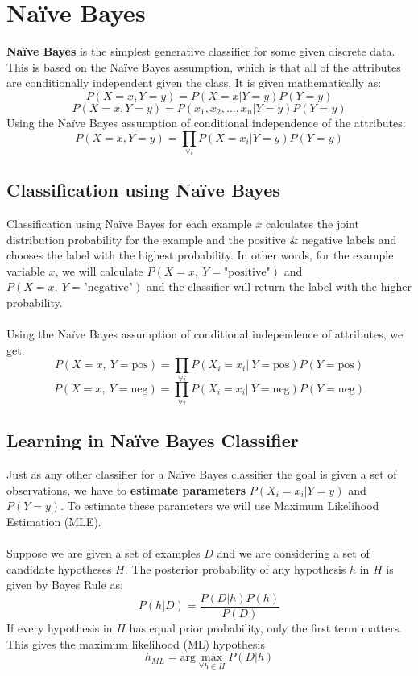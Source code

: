 \documentclass[12pt, a4paper]{book}
\begin{document}
\section{Naïve Bayes}
\textbf{Naïve Bayes} is the simplest generative classifier for some given discrete data. This is based on the Naïve Bayes assumption, which is that all of the attributes are conditionally independent given the class. It is given mathematically as:
$$P(X=x,Y=y) = P(X=x|Y=y)P(Y=y)$$
$$P(X=x,Y=y) = P(x_1,x_2,\ldots,x_n|Y=y)P(Y=y)$$
Using the Naïve Bayes assumption of conditional independence of the attributes:
$$P(X=x,Y=y) = \prod_{\forall i}P(X=x_i|Y=y)P(Y=y)$$

\subsection{Classification using Naïve Bayes}
Classification using Naïve Bayes for each example $x$ calculates the joint distribution probability for the example and the positive $\&$ negative labels and chooses the label with the highest probability. In other words, for the example variable $x$, we will calculate $P(X = x, \ Y = \text{"positive"})$ and $P(X = x, \ Y = \text{"negative"})$ and the classifier will return the label with the higher probability.\\\\
Using the Naïve Bayes assumption of conditional independence of attributes, we get:
$$P(X=x,\ Y=\text{pos}) = \prod_{\forall i}P(X_i=x_i| \ Y=\text{pos})P(Y=\text{pos})$$
$$P(X=x,\ Y=\text{neg}) = \prod_{\forall i}P(X_i=x_i| \ Y=\text{neg})P(Y=\text{neg})$$

\subsection{Learning in Naïve Bayes Classifier}
Just as any other classifier for a Naïve Bayes classifier the goal is given a set of observations, we have to \textbf{estimate parameters} $P(X_i=x_i|Y=y)$ and $P(Y=y)$. To estimate these parameters we will use Maximum Likelihood Estimation (MLE).\\\\
Suppose we are given a set of examples $D$ and we are considering a set of candidate hypotheses $H$. The posterior probability of any hypothesis $h$ in $H$ is given by Bayes Rule as:
$$P(h|D) = \frac{P(D|h)P(h)}{P(D)}$$
If every hypothesis in $H$ has equal prior probability, only the first term matters. This gives the maximum likelihood (ML)
hypothesis
$$h_{ML} = \text{arg}\max_{\forall h \in H}P(D|h)$$
\end{document}
